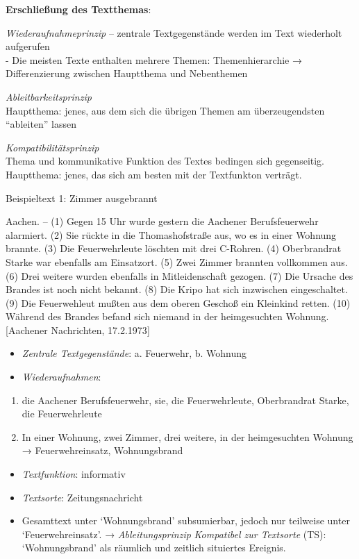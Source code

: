 \documentclass[
  letterpaper,
]{scrbook}
\providecommand{\tightlist}{%
  \setlength{\itemsep}{0pt}\setlength{\parskip}{0pt}}\usepackage{longtable,booktabs,array}
\begin{document}
\textbf{Erschließung des Textthemas}:

\emph{Wiederaufnahmeprinzip} -- zentrale Textgegenstände werden im Text
wiederholt aufgerufen\\
- Die meisten Texte enthalten mehrere Themen: Themenhierarchie →
Differenzierung zwischen Hauptthema und Nebenthemen

\emph{Ableitbarkeitsprinzip}\\
Hauptthema: jenes, aus dem sich die übrigen Themen am überzeugendsten
``ableiten'' lassen

\emph{Kompatibilitätsprinzip}\\
Thema und kommunikative Funktion des Textes bedingen sich gegenseitig.
Hauptthema: jenes, das sich am besten mit der Textfunkton verträgt.

Beispieltext 1: Zimmer ausgebrannt

Aachen. -- (1) Gegen 15 Uhr wurde gestern die Aachener Berufsfeuerwehr
alarmiert. (2) Sie rückte in die Thomashofstraße aus, wo es in einer
Wohnung brannte. (3) Die Feuerwehrleute löschten mit drei C-Rohren. (4)
Oberbrandrat Starke war ebenfalls am Einsatzort. (5) Zwei Zimmer
brannten vollkommen aus. (6) Drei weitere wurden ebenfalls in
Mitleidenschaft gezogen. (7) Die Ursache des Brandes ist noch nicht
bekannt. (8) Die Kripo hat sich inzwischen eingeschaltet. (9) Die
Feuerwehleut mußten aus dem oberen Geschoß ein Kleinkind retten. (10)
Während des Brandes befand sich niemand in der heimgesuchten Wohnung.\\
{[}Aachener Nachrichten, 17.2.1973{]}

\begin{itemize}
\tightlist
\item
  \emph{Zentrale Textgegenstände}: a. Feuerwehr, b. Wohnung\\
\item
  \emph{Wiederaufnahmen}:
\end{itemize}

\begin{enumerate}
\def\labelenumi{\alph{enumi}.}
\tightlist
\item
  die Aachener Berufsfeuerwehr, sie, die Feuerwehrleute, Oberbrandrat
  Starke, die Feuerwehrleute
\item
  In einer Wohnung, zwei Zimmer, drei weitere, in der heimgesuchten
  Wohnung → Feuerwehreinsatz, Wohnungsbrand\\
\end{enumerate}

\begin{itemize}
\tightlist
\item
  \emph{Textfunktion}: informativ
\item
  \emph{Textsorte}: Zeitungsnachricht
\item
  Gesamttext unter `Wohnungsbrand' subsumierbar, jedoch nur teilweise
  unter `Feuerwehreinsatz'. → \emph{Ableitungsprinzip} \emph{Kompatibel
  zur Textsorte} (TS): `Wohnungsbrand' als räumlich und zeitlich
  situiertes Ereignis.
\end{itemize}
\end{document}
